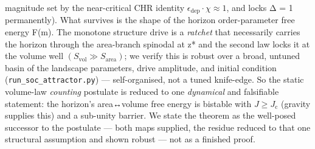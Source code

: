 \documentclass[
  10pt,
]{article}
\begin{document}
magnitude set by the near-critical CHR identity
\(\epsilon _{\mathrm{dep}}\cdot \chi  \approx  1\), and locks Δ = 1
permanently). What survives is the shape of the horizon order-parameter
free energy F(m). The monotone structure drive is a \emph{ratchet} that
necessarily carries the horizon through the area-branch spinodal at z*
and the second law locks it at the volume well
\((S_{\mathrm{vol}} \gg  S_{\mathrm{area}})\); we verify this is robust
over a broad, untuned basin of the landscape parameters, drive
amplitude, and initial condition (\texttt{run\_soc\_attractor.py}) ---
self-organised, not a tuned knife-edge. So the static volume-law
\emph{counting} postulate is reduced to one \emph{dynamical} and
falsifiable statement: the horizon's area↔volume free energy is bistable
with \(J \geq  J_{\mathrm{c}}\) (gravity supplies this) and a sub-unity
barrier. We state the theorem as the well-posed successor to the
postulate --- both maps supplied, the residue reduced to that one
structural assumption and shown robust --- not as a finished proof.
\end{document}
